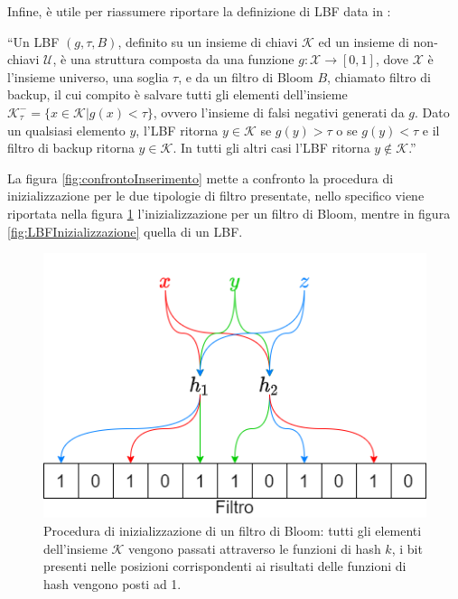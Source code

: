\documentclass[../../main.tex]{subfiles}
\begin{document}
    Infine, è utile per riassumere riportare la definizione di LBF data in \cite{10.5555/3326943.3326986}: 

    ``Un LBF $(g, \tau, B)$, definito su un insieme di chiavi $\mathcal{K}$ ed un insieme di non-chiavi $\mathcal{U}$, è una struttura composta da una funzione $g : \mathcal{X} \rightarrow [0,1]$, dove $\mathcal{X}$ è l'insieme universo, una soglia $\tau$, e da un filtro di Bloom $B$, chiamato filtro di backup, il cui compito è salvare tutti gli elementi dell'insieme $\mathcal{K}_{\tau}^- = \{x \in \mathcal{K} | g(x) < \tau\}$, ovvero l'insieme di falsi negativi generati da $g$. Dato un qualsiasi elemento $y$, l'LBF ritorna $y \in \mathcal{K}$ se $g(y) > \tau$ o se $g(y) < \tau$ e il filtro di backup ritorna $y \in \mathcal{K}$. In tutti gli altri casi l'LBF ritorna $y \notin \mathcal{K}$.''

    La figura \ref{fig:confrontoInserimento} mette a confronto la procedura di inizializzazione per le due tipologie di filtro presentate, nello specifico viene riportata nella figura \ref{fig:BFInizializzazione} l'inizializzazione per un filtro di Bloom, mentre in figura \ref{fig:LBFInizializzazione} quella di un LBF.

    \begin{figure}[H]
        \centering
        \includegraphics[width=\textwidth]{immagini/5_1/BFInizializzazione.png}
        \caption{Procedura di inizializzazione di un filtro di Bloom: tutti gli elementi dell'insieme $\mathcal{K}$ vengono passati attraverso le funzioni di hash $k$, i bit presenti nelle posizioni corrispondenti ai risultati delle funzioni di hash vengono posti ad 1.}
        \label{fig:BFInizializzazione}
    \end{figure}
\end{document}
